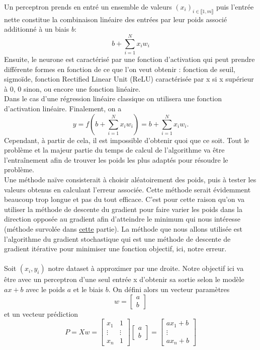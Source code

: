     Un perceptron prends en entré un ensemble de valeurs $(x_i)_{i\in \llbracket 1, m \rrbracket}$ puis l'entrée nette constitue la combinaison linéaire des entrées par leur poids associé additionné à un biais $b$: 
    $$
    b + \sum^N_{i=1} x_iw_i
    $$
    Ensuite, le neurone est caractérisé par une fonction d'activation qui peut prendre différente formes en fonction de ce que l'on veut obtenir : fonction de seuil, sigmoïde, fonction Rectified Linear Unit (ReLU) caractérisée par x si x supérieur à 0, 0 sinon, ou encore une fonction linéaire.\\
    Dans le cas d'une régression linéaire classique on utilisera une fonction d'activation linéaire. Finalement, on a
    $$
    y=f(b + \sum^N_{i=1} x_iw_i)=b + \sum^N_{i=1} x_iw_i.
    $$
    Cependant, à partir de cela, il est impossible d'obtenir quoi que ce soit. Tout le problème et la majeur partie du temps de calcul de l'algorithme va être l'entraînement afin de trouver les poids les plus adaptés pour résoudre le problème.\\Une méthode naïve consisterait à choisir aléatoirement des poids, puis à tester les valeurs obtenus en calculant l'erreur associée. Cette méthode serait évidemment beaucoup trop longue et pas du tout efficace. C'est pour cette raison qu'on va utiliser la méthode de descente du gradient pour faire varier les poids dans la direction opposée au gradient afin d'atteindre le minimum qui nous intéresse (méthode survolée dans \hyperref[subsubsec:LM]{cette} partie). La méthode que nous allons utilisée est l'algorithme du gradient stochastique qui est une méthode de descente de gradient itérative pour minimiser une fonction objectif, ici, notre erreur.
    \\\\
    Soit $(x_i,y_i)$ notre dataset à approximer par une droite. Notre objectif ici va être avec un perceptron d'une seul entrée x d'obtenir sa sortie selon le modèle $ax+b$ avec le poids $a$ et le biais $b$. On défini alors un vecteur paramètres $$
    w = \begin{bmatrix}
        a\\b
    \end{bmatrix}
    $$
    et un vecteur prédiction 
    $$
    P = Xw = \begin{bmatrix}
        x_1&1\\\vdots&\vdots\\x_n&1
    \end{bmatrix}\begin{bmatrix}
        a\\b
    \end{bmatrix}=\begin{bmatrix}
        ax_1+b\\\vdots\\ax_n+b
    \end{bmatrix}
    $$
